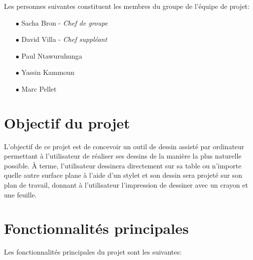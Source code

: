 \documentclass[11pt,a4paper,oldfontcommands]{memoir}
\begin{document}
Les personnes suivantes constituent les membres du groupe de l'équipe de projet:

\begin{itemize}
\item[$\bullet$] Sacha Bron - \textit{Chef de groupe}
\item[$\bullet$] David Villa - \textit{Chef suppléant}
\item[$\bullet$] Paul Ntawuruhunga
\item[$\bullet$] Yassin Kammoun
\item[$\bullet$] Marc Pellet
\end{itemize}

\section{Objectif du projet}

L'objectif de ce projet est de concevoir un outil de dessin assisté par ordinateur permettant à l'utilisateur de réaliser ses dessins de la manière la plus naturelle possible. À terme, l'utilisateur dessinera directement sur sa table ou n'importe quelle autre surface plane à l'aide d'un stylet et son dessin sera projeté sur son plan de travail, donnant à l'utilisateur l'impression de dessiner avec un crayon et une feuille.

\section{Fonctionnalités principales}

Les fonctionnalités principales du projet sont les suivantes:
\end{document}
